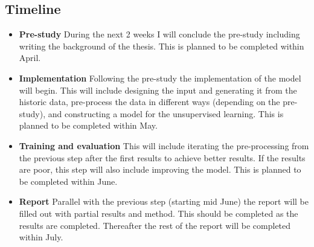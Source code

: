 \documentclass{article}
\begin{document}
\subsection{Timeline}
\begin{itemize}
\item{\bf Pre-study} During the next 2 weeks I will conclude the pre-study including writing the background of the thesis. This is planned to be completed within April.
\item{\bf Implementation} Following the pre-study the implementation of the model will begin. This will include designing the input and generating it from the historic data, pre-process the data in different ways (depending on the pre-study), and constructing a model for the unsupervised learning. This is planned to be completed within May.
\item{\bf Training and evaluation} This will include iterating the pre-processing from the previous step after the first results to achieve better results. If the results are poor, this step will also include improving the model. This is planned to be completed within June.
\item{\bf Report} Parallel with the previous step (starting mid June) the report will be filled out with partial results and method. This should be completed as the results are completed. Thereafter the rest of the report will be completed within July.
\end{itemize}

{}

\end{document}
